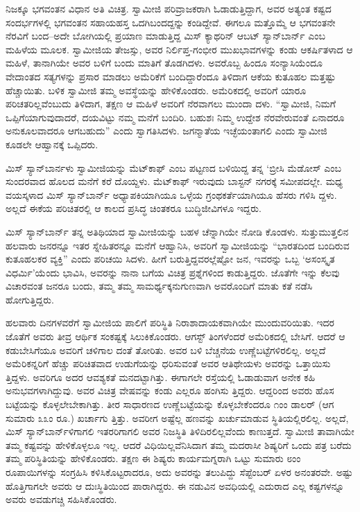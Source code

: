 ನಿಜಕ್ಕೂ ಭಗವಂತನ ವಿಧಾನ ಅತಿ ವಿಚಿತ್ರ. ಸ್ವಾಮೀಜಿ ಪರಿವ್ರಾಜಕರಾಗಿ ಓಡಾಡುತ್ತಿದ್ದಾಗ, ಅವರ ಅತ್ಯಂತ ಕಷ್ಟದ ಸಂದರ್ಭಗಳಲ್ಲಿ ಭಗವಂತನ ಸಹಾಯಹಸ್ತ ಒದಗಿಬಂದದ್ದನ್ನು ಕಂಡಿದ್ದೇವೆ. ಈಗಲೂ ಮತ್ತೊಮ್ಮೆ ಆ ಭಗವಂತನೇ ನೆರವಿಗೆ ಬಂದ–ಅದೇ ಬೋಗಿಯಲ್ಲಿ ಪ್ರಯಾಣ ಮಾಡುತ್ತಿದ್ದ ಮಿಸ್ ಕ್ಯಾಥರಿನ್ ಆಬಟ್ ಸ್ಯಾನ್​ಬಾರ್ನ್  ಎಂಬ ಮಹಿಳೆಯ ಮೂಲಕ. ಸ್ವಾಮೀಜಿಯ ತೇಜಸ್ಸು, ಅವರ ನಿರ್ಲಿಪ್ತ-ಗಂಭೀರ ಮುಖಭಾವಗಳನ್ನು ಕಂಡು ಆಕರ್ಷಿತಳಾದ ಆ ಮಹಿಳೆ, ತಾನಾಗಿಯೇ ಅವರ ಬಳಿಗೆ ಬಂದು ಮಾತಿಗೆ ತೊಡಗಿದಳು. ಅವರೊಬ್ಬ ಹಿಂದೂ ಸಂನ್ಯಾಸಿಯೆಂದೂ ವೇದಾಂತದ ಸತ್ಯಗಳನ್ನು ಪ್ರಸಾರ ಮಾಡಲು ಅಮೆರಿಕೆಗೆ ಬಂದಿದ್ದಾರೆಂದೂ ತಿಳಿದಾಗ ಆಕೆಯ ಕುತೂಹಲ ಮತ್ತಷ್ಟು ಹೆಚ್ಚಾಯಿತು. ಬಳಿಕ ಸ್ವಾಮೀಜಿ ತಮ್ಮ ಅವಸ್ಥೆಯನ್ನು ಹೇಳಿಕೊಂಡರು. ಅಮೆರಿಕದಲ್ಲಿ ಅವರಿಗೆ ಯಾರೂ ಪರಿಚತರಿಲ್ಲವೆಂಬುದು ತಿಳಿದಾಗ, ತಕ್ಷಣ ಆ ಮಹಿಳೆ ಅವರಿಗೆ ನೆರವಾಗಲು ಮುಂದಾ ದಳು. “ಸ್ವಾಮೀಜಿ, ನಿಮಗೆ ಒಪ್ಪಿಗೆಯಾಗುವುದಾದರೆ, ದಯವಿಟ್ಟು ನಮ್ಮ ಮನೆಗೆ ಬಂದಿರಿ. ಬಹುಶಃ ನಿಮ್ಮ ಉದ್ದೇಶ ನೆರವೇರುವಂತೆ ಏನಾದರೂ ಅನುಕೂಲವಾದರೂ ಆಗಬಹುದು” ಎಂದು ಸ್ವಾಗತಿಸಿದಳು. ಜಗನ್ಮಾತೆಯ ಇಚ್ಛೆಯಂತಾಗಲಿ ಎಂದು ಸ್ವಾಮೀಜಿ ಕೂಡಲೇ ಆಹ್ವಾನಕ್ಕೆ ಒಪ್ಪಿದರು.

ಮಿಸ್ ಸ್ಯಾನ್​ಬಾರ್ನಳು ಸ್ವಾಮೀಜಿಯನ್ನು ಮೆಟ್​ಕಾಫ್ ಎಂಬ ಪಟ್ಟಣದ ಬಳಿಯಿದ್ದ ತನ್ನ ‘ಬ್ರೀಸಿ ಮೆಡೋಸ್​ ಎಂಬ ಸುಂದರವಾದ ಹೊಲದ ಮನೆಗೆ ಕರೆ ದೊಯ್ದಳು. ಮೆಟ್​ಕಾಫ್ ಇರುವುದು ಬಾಸ್ಟನ್ ನಗರಕ್ಕೆ ಸಮೀಪದಲ್ಲೇ. ಮಧ್ಯ ವಯಸ್ಕಳಾದ ಮಿಸ್ ಸ್ಯಾನ್​ಬಾರ್ನ್ ಅಧ್ಯಾಪಕಿಯಾಗಿಯೂ ಒಳ್ಳೆಯ ಗ್ರಂಥಕರ್ತೆಯಾಗಿಯೂ ಹೆಸರು ಗಳಿಸಿ ದ್ದಳು. ಅಲ್ಲದೆ ಈಕೆಯ ಪರಿಚಿತರಲ್ಲಿ ಆ ಕಾಲದ ಪ್ರಸಿದ್ಧ ಚಿಂತಕರೂ ಬುದ್ಧಿಜೀವಿಗಳೂ ಇದ್ದರು.

ಮಿಸ್ ಸ್ಯಾನ್​ಬಾರ್ನ್ ತನ್ನ ಅತಿಥಿಯಾದ ಸ್ವಾಮೀಜಿಯನ್ನು ಬಹಳ ಚೆನ್ನಾಗಿಯೇ ನೋಡಿ ಕೊಂಡಳು. ಸುತ್ತುಮುತ್ತಲಿನ ಹಲವಾರು ಜನರನ್ನೂ ಇತರ ಸ್ನೇಹಿತರನ್ನೂ ಮನೆಗೆ ಆಹ್ವಾನಿಸಿ, ಅವರಿಗೆ ಸ್ವಾಮೀಜಿಯನ್ನು “ಭಾರತದಿಂದ ಬಂದಿರುವ ಕುತೂಹಲಕರ ವ್ಯಕ್ತಿ” ಎಂದು ಪರಿಚಯಿ ಸಿದಳು. ಹೀಗೆ ಬರುತ್ತಿದ್ದವರಲ್ಲೆಷ್ಟೋ ಜನ, ಇವರನ್ನು ಒಬ್ಬ ‘ಅಸಂಸ್ಕೃತ ವಿಧರ್ಮಿ’ಯೆಂದು ಭಾವಿಸಿ, ಅವರನ್ನು ನಾನಾ ಬಗೆಯ ವಿಚಿತ್ರ ಪ್ರಶ್ನೆಗಳಿಂದ ಕಾಡುತ್ತಿದ್ದರು. ಜೊತೆಗೇ ಇನ್ನು ಕೆಲವು ವಿಚಾರವಂತ ಜನರೂ ಬಂದು, ತಮ್ಮ ತಮ್ಮ ಸಾಮರ್ಥ್ಯಕ್ಕನುಗುಣವಾಗಿ ಅವರೊಂದಿಗೆ ಮಾತು ಕತೆ ನಡೆಸಿ ಹೋಗುತ್ತಿದ್ದರು.

ಹಲವಾರು ದಿನಗಳವರೆಗೆ ಸ್ವಾಮೀಜಿಯ ಪಾಲಿಗೆ ಪರಿಸ್ಥಿತಿ ನಿರಾಶಾದಾಯಕವಾಗಿಯೇ ಮುಂದುವರಿಯಿತು. ಇದರ ಜೊತೆಗೆ ಅವರು ತೀವ್ರ ಆರ್ಥಿಕ ಸಂಕಷ್ಟಕ್ಕೆ ಸಿಲುಕಿಕೊಂಡರು. ಆಗಸ್ಟ್ ತಿಂಗಳೆಂದರೆ ಅಮೆರಿಕದಲ್ಲಿ ಬೇಸಿಗೆ. ಆದರೆ ಆ ಕಡುಬೇಸಿಗೆಯೂ ಅವರಿಗೆ ಚಳಿಗಾಲ ದಂತೆ ತೋರಿತು. ಅವರ ಬಳಿ ಬೆಚ್ಚನೆಯ ಉಣ್ಣೆಬಟ್ಟೆಗಳಿರಲಿಲ್ಲ. ಅಲ್ಲದೆ ಅಮೆರಿಕನ್ನರಿಗೆ ಹೆಚ್ಚು ಪರಿಚಿತವಾದ ಉಡುಗೆಯನ್ನು ಧರಿಸುವಂತೆ ಅವರ ಆತಿಥೇಯಳು ಅವರನ್ನು ಒತ್ತಾಯಿಸು ತ್ತಿದ್ದಳು. ಅವರಿಗೂ ಅದರ ಆವಶ್ಯಕತೆ ಮನದಟ್ಟಾಗಿತ್ತು. ಈಗಾಗಲೇ ರಸ್ತೆಯಲ್ಲಿ ಓಡಾಡುವಾಗ ಅನೇಕ ಕಹಿ ಅನುಭವಗಳಾಗಿದ್ದುವು. ಅವರ ವಿಚಿತ್ರ ವೇಷವನ್ನು ಕಂಡು ಎಲ್ಲರೂ ಹಂಗಿಸು ತ್ತಿದ್ದರು. ಆದ್ದರಿಂದ ಅವರು ಹೊಸ ಬಟ್ಟೆಯನ್ನು ಕೊಳ್ಳಲೇಬೇಕಾಗಿತ್ತು. ತೀರ ಸಾಧಾರಣದ ಉಣ್ಣೆಬಟ್ಟೆಯನ್ನು ಕೊಳ್ಳಬೇಕೆಂದರೂ ೧ಂಂ ಡಾಲರ್ (ಆಗ ಸುಮಾರು ೩೩ಂ ರೂ.) ಖರ್ಚಾಗು ತ್ತಿತ್ತು. ಅವರೀಗ ಅಷ್ಟೆಲ್ಲ ಹಣವನ್ನು ಖರ್ಚುಮಾಡುವ ಸ್ಥಿತಿಯಲ್ಲಿರಲಿಲ್ಲ. ಅಲ್ಲದೆ, ಮಿಸ್ ಸ್ಯಾನ್​ಬಾರ್ನ್​ಳಿಗಾಗಲಿ ಇತರರಿಗಾಗಲಿ ಅವರ ನಿಜಸ್ಥಿತಿ ತಿಳಿದಿರಲಿಲ್ಲವೆಂದು ಕಾಣುತ್ತದೆ. ಸ್ವಾಮೀಜಿ ತಾವಾಗಿಯೇ ತಮ್ಮ ಕಷ್ಟವನ್ನು ಹೇಳಿಕೊಳ್ಳಲೂ ಇಲ್ಲ. ಆದರೆ ವಿಧಿಯಿಲ್ಲವೆನಿಸಿದಾಗ ತಮ್ಮ ಮದರಾಸೀ ಶಿಷ್ಯರಿಗೆ ಒಂದು ಪತ್ರ ಬರೆದು ತಮ್ಮ ಪರಿಸ್ಥಿತಿಯನ್ನು ಹೇಳಿಕೊಂಡರು. ತಕ್ಷಣ ಈ ಶಿಷ್ಯರು ಕಾರ್ಯಮಗ್ನರಾಗಿ ಒಟ್ಟು ಸುಮಾರು ೮ಂಂ ರೂಪಾಯಿಗಳನ್ನು ಸಂಗ್ರಹಿಸಿ ಕಳಿಸಿಕೊಟ್ಟರಾದರೂ, ಅದು ಅವರನ್ನು ತಲುಪಿದ್ದು ಸೆಪ್ಟೆಂಬರ್ ಏಳರ ಅನಂತರವೇ. ಅಷ್ಟು ಹೊತ್ತಿಗಾಗಲೇ ಅವರು ಆ ದುಃಸ್ಥಿತಿಯಿಂದ ಪಾರಾಗಿದ್ದರು. ಈ ನಡುವಿನ ಅವಧಿಯಲ್ಲಿ ಎದುರಾದ ಎಲ್ಲ ಕಷ್ಟಗಳನ್ನೂ ಅವರು ಅವಡುಗಚ್ಚಿ ಸಹಿಸಿಕೊಂಡರು.

